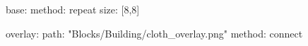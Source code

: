 base:
  method: repeat
  size: [8,8]

overlay:
  path: "Blocks/Building/cloth_overlay.png"
  method: connect